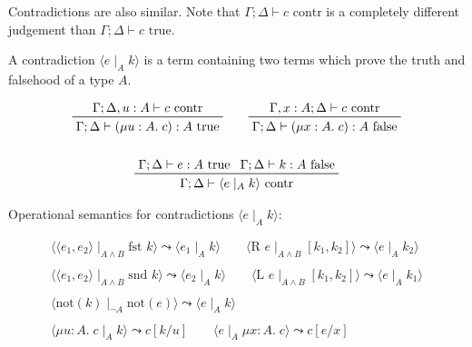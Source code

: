 \documentclass[a4paper,11pt]{article}
\begin{document}
{{        Contradictions are also similar. Note that \(\Gamma;\Delta\vdash c\text{ contr}\) is a completely different
        judgement than \(\Gamma;\Delta\vdash c\text{ true}\).

        A contradiction \(\langle e \mid_A k \rangle\) is a term containing two terms which prove the truth and
        falsehood of a type \(A\).

        \begin{gather*}
        \prftree[r]{}
        {\Gamma;\Delta,u:A\vdash c\text{ contr}}
        {\Gamma;\Delta\vdash (\mu u:A.\;c):A\text{ true}}
        \qquad
        \prftree[r]{}
        {\Gamma,x:A;\Delta\vdash c\text{ contr}}
        {\Gamma;\Delta\vdash (\mu x:A.\;c):A\text{ false}}
        \\
        \\
        \prftree[r]{}
        {\Gamma;\Delta\vdash e:A \text{ true}}
        {\Gamma;\Delta\vdash k:A \text{ false}}
        {\Gamma;\Delta\vdash \langle e \mid_A k \rangle \text{ contr}}
        \\
        \end{gather*}

        Operational semantics for contradictions \(\langle e \mid_A k \rangle\):

        \begin{gather*}
        \langle\langle e_1,e_2 \rangle \mid_{A \wedge B} \text{fst }k\rangle \leadsto \langle e_1 \mid_A k \rangle
        \qquad
        \langle \text{R }e \mid_{A \wedge B} [k_1,k_2] \rangle \leadsto \langle e \mid_A k_2 \rangle
        \\
        \\
        \langle\langle e_1,e_2 \rangle \mid_{A \wedge B} \text{snd }k\rangle \leadsto \langle e_2 \mid_A k \rangle
        \qquad
        \langle \text{L }e \mid_{A \wedge B} [k_1,k_2] \rangle \leadsto \langle e \mid_A k_1 \rangle
        \\
        \\
        \langle \text{not}(k) \mid_{\neg A} \text{not}(e) \rangle \leadsto \langle e \mid_A k \rangle
        \\
        \\
        \langle \mu u:A.\;c \mid_A k \rangle \leadsto c[k/u]
        \qquad
        \langle e \mid_A \mu x:A.\;c \rangle \leadsto c[e/x]
        \end{gather*}

}}
\end{document}
